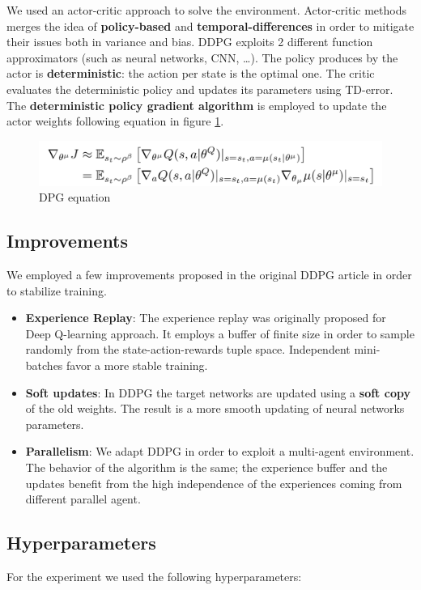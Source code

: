 \documentclass[11pt]{article}
\begin{document}
We used an actor-critic approach to solve the environment. Actor-critic methods
merges the idea of \textbf{policy-based} and \textbf{temporal-differences} in order to
mitigate their issues both in variance and bias. DDPG exploits 2 different
function approximators (such as neural networks, CNN, \ldots{}). The policy produces
by the actor is \textbf{deterministic}: the action per state is the optimal one. The
critic evaluates the deterministic policy and updates its parameters using
TD-error. The \textbf{deterministic policy gradient algorithm} is employed to update
the actor weights following equation in figure \ref{fig:org9e577f9}.


\begin{figure}[htbp]
\centering
\includegraphics[width=.9\linewidth]{../contents/dpg.png}
\caption{\label{fig:org9e577f9}DPG equation}
\end{figure}

\subsection{Improvements}
\label{sec:org7537283}
We employed a few improvements proposed in the original DDPG article in order to
stabilize training.

\begin{itemize}
\item \textbf{Experience Replay}: The experience replay was originally proposed for Deep
Q-learning approach. It employs a buffer of finite size in order to sample
randomly from the state-action-rewards tuple space. Independent mini-batches
favor a more stable training.
\item \textbf{Soft updates}: In DDPG the target networks are updated using a \textbf{soft copy} of
the old weights. The result is a more smooth updating of neural networks
parameters.
\item \textbf{Parallelism}: We adapt DDPG in order to exploit a multi-agent
environment. The behavior of the algorithm is the same; the experience buffer
and the updates benefit from the high independence of the experiences coming
from different parallel agent.
\end{itemize}

\subsection{Hyperparameters}
\label{sec:orgcacea13}
For the experiment we used the following hyperparameters:
\end{document}
